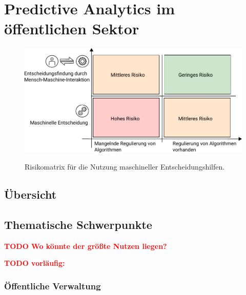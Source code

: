 \documentclass[12pt,a4paper,listof=totoc,oneside]{scrreprt}
\newcommand{\todo}[1]{\textcolor{red}{\textbf{TODO #1}}}
\begin{document}










\tableofcontents
\setcounter{page}{1}





\chapter{Predictive Analytics im öffentlichen Sektor}

\begin{figure}%
\centering
\caption{Risikomatrix für die Nutzung maschineller Entscheidungshilfen.}
\includegraphics[scale=1.0]{Grafiken/Risk_Matrix_Ink.pdf} 
\label{pic:Risiko_Matrix}
\end{figure}

\section{Übersicht}

\section{Thematische Schwerpunkte}
\todo{Wo könnte der größte Nutzen liegen?}

\todo{vorläufig:}

\subsection{Öffentliche Verwaltung}
\end{document}
